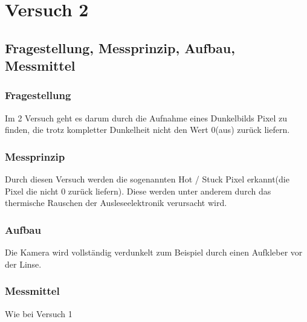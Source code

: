 \chapter{Versuch 2}
\label{chap:VERSUCH_2}

\section{Fragestellung, Messprinzip, Aufbau, Messmittel}
\label{chap:VERSUCH_2_FRAGESTELLUNG}
\subsection*{Fragestellung}
Im 2 Versuch geht es darum durch die Aufnahme eines Dunkelbilds Pixel zu finden, die trotz kompletter Dunkelheit nicht den Wert 0(aus) zurück liefern.
\subsection*{Messprinzip}
Durch diesen Versuch werden die sogenannten Hot / Stuck Pixel erkannt(die Pixel die nicht 0 zurück liefern). Diese werden unter anderem durch das thermische Rauschen der Ausleseelektronik verursacht wird.
\subsection*{Aufbau}
Die Kamera wird vollständig verdunkelt zum Beispiel durch einen Aufkleber vor der Linse.
\subsection*{Messmittel}
Wie bei Versuch 1

\newpage
